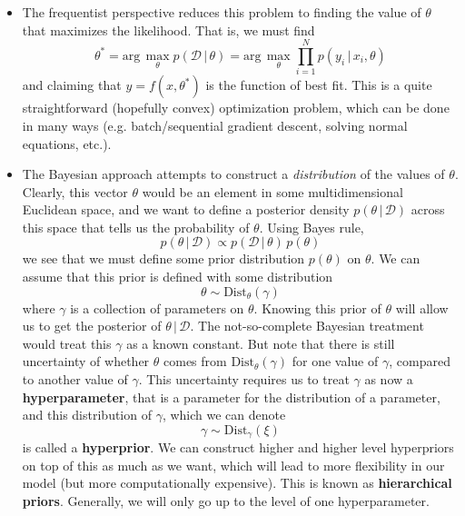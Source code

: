 \documentclass{article}
\begin{document}
    \begin{itemize}
      \item The frequentist perspective reduces this problem to finding the value of $\theta$ that maximizes the likelihood. That is, we must find
      \begin{equation}
        \theta^* = \text{arg}\, \max_{\theta} p(\mathcal{D}\,|\,\theta) = \text{arg}\, \max_{\theta} \prod_{i=1}^N p(y_i \,|\,x_i, \theta)
      \end{equation}
      and claiming that $y = f(x, \theta^*)$ is the function of best fit. This is a quite straightforward (hopefully convex) optimization problem, which can be done in many ways (e.g. batch/sequential gradient descent, solving normal equations, etc.).

      \item The Bayesian approach attempts to construct a \textit{distribution} of the values of $\theta$. Clearly, this vector $\theta$ would be an element in some multidimensional Euclidean space, and we want to define a posterior density $p(\theta\,|\,\mathcal{D})$ across this space that tells us the probability of $\theta$. Using Bayes rule,
      \begin{equation}
        p(\theta\,|\,\mathcal{D}) \propto p(\mathcal{D}\,|\,\theta) \, p(\theta)
      \end{equation}
      we see that we must define some prior distribution $p(\theta)$ on $\theta$. We can assume that this prior is defined with some distribution
      \begin{equation}
        \theta \sim \text{Dist}_\theta (\gamma)
      \end{equation}
      where $\gamma$ is a collection of parameters on $\theta$. Knowing this prior of $\theta$ will allow us to get the posterior of $\theta\,|\,\mathcal{D}$. The not-so-complete Bayesian treatment would treat this $\gamma$ as a known constant. But note that there is still uncertainty of whether $\theta$ comes from $\text{Dist}_\theta (\gamma)$ for one value of $\gamma$, compared to another value of $\gamma$. This uncertainty requires us to treat $\gamma$ as now a \textbf{hyperparameter}, that is a parameter for the distribution of a parameter, and this distribution of $\gamma$, which we can denote
      \begin{equation}
        \gamma \sim \text{Dist}_\gamma (\xi)
      \end{equation}
      is called a \textbf{hyperprior}. We can construct higher and higher level hyperpriors on top of this as much as we want, which will lead to more flexibility in our model (but more computationally expensive). This is known as \textbf{hierarchical priors}. Generally, we will only go up to the level of one hyperparameter.
    \end{itemize}
\end{document}
